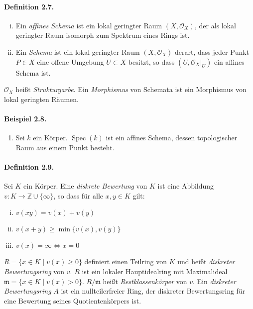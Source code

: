 \paragraph{Definition 2.7.}\label{2.7} \begin{enumerate}[(i)]
\item Ein \textit{affines Schema} ist ein lokal geringter Raum $(X,\mathcal{O}_X)$, der als lokal geringter Raum isomorph zum Spektrum eines Rings ist.
\item Ein \textit{Schema} ist ein lokal geringter Raum $(X,\mathcal{O}_X)$ derart, dass jeder Punkt $P\in X$ eine offene Umgebung $U\subset X$ besitzt, so dass $(U,\mathcal{O}_X|_U)$ ein affines Schema ist.
\end{enumerate}
$\mathcal{O}_X$ heißt \textit{Strukturgarbe}. Ein \textit{Morphismus} von Schemata ist ein Morphismus von lokal geringten Räumen.

\paragraph{Beispiel 2.8.}\label{2.8}\begin{enumerate}
\item Sei $k$ ein Körper. $\operatorname{Spec}(k)$ ist ein affines Schema, dessen topologischer Raum aus einem Punkt besteht.
\end{enumerate}

\paragraph{Definition 2.9.}\label{2.9} Sei $K$ ein Körper. Eine \textit{diskrete Bewertung} von $K$ ist eine Abbildung $v:K\to\mathbb{Z}\cup\{\infty\}$, so dass für alle $x,y\in K$ gilt:
\begin{enumerate}[(i)]
\item $v(xy)=v(x)+v(y)$
\item $v(x+y)\geq \min\{v(x),v(y)\}$
\item $v(x)=\infty\iff x=0$
\end{enumerate}
$R=\{x\in K\mid v(x)\geq 0\}$ definiert einen Teilring von $K$ und heißt \textit{diskreter Be\-wer\-tungs\-ring} von $v$. $R$ ist ein lokaler Hauptidealring mit Maximalideal $\mathfrak{m}=\{x\in K\mid v(x) >0\}$. $R/\mathfrak{m}$ heißt \textit{Restklassenkörper} von $v$. Ein \textit{diskreter Bewertungsring} $A$ ist ein nullteilerfreier Ring, der diskreter Bewertungsring für eine Bewertung seines Quotientenkörpers ist.

